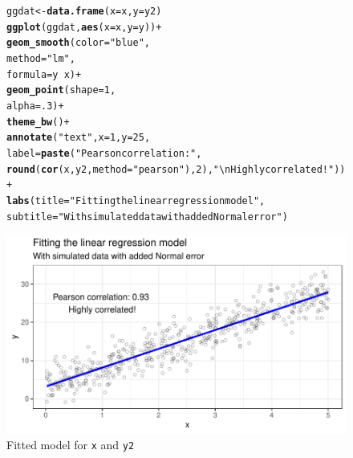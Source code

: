 \documentclass{article}\usepackage[]{graphicx}\usepackage[]{color}
\makeatletter
\def\maxwidth{ %
  \ifdim\Gin@nat@width>\linewidth
    \linewidth
  \else
    \Gin@nat@width
  \fi
}
\newcommand{\hlnum}[1]{\textcolor[rgb]{0.686,0.059,0.569}{#1}}%
\newcommand{\hlstr}[1]{\textcolor[rgb]{0.192,0.494,0.8}{#1}}%
\newcommand{\hlopt}[1]{\textcolor[rgb]{0,0,0}{#1}}%
\newcommand{\hlstd}[1]{\textcolor[rgb]{0.345,0.345,0.345}{#1}}%
\newcommand{\hlkwb}[1]{\textcolor[rgb]{0.69,0.353,0.396}{#1}}%
\newcommand{\hlkwc}[1]{\textcolor[rgb]{0.333,0.667,0.333}{#1}}%
\newcommand{\hlkwd}[1]{\textcolor[rgb]{0.737,0.353,0.396}{\textbf{#1}}}%
\newenvironment{kframe}{%
 \def\at@end@of@kframe{}%
 \ifinner\ifhmode%
  \def\at@end@of@kframe{\end{minipage}}%
  \begin{minipage}{\columnwidth}%
 \fi\fi%
 \def\FrameCommand##1{\hskip\@totalleftmargin \hskip-\fboxsep
 \colorbox{shadecolor}{##1}\hskip-\fboxsep
     \hskip-\linewidth \hskip-\@totalleftmargin \hskip\columnwidth}%
 \MakeFramed {\advance\hsize-\width
   \@totalleftmargin\z@ \linewidth\hsize
   \@setminipage}}%
 {\par\unskip\endMakeFramed%
 \at@end@of@kframe}
\newenvironment{knitrout}{}{} %
\makeatother
\begin{document}
\begin{enumerate}
\begin{enumerate}
\begin{figure}[H]
\begin{center}
\begin{knitrout}
\color{fgcolor}\begin{kframe}
\begin{alltt}
\hlstd{ggdat}\hlkwb{<-}\hlkwd{data.frame}\hlstd{(}\hlkwc{x}\hlstd{=x,} \hlkwc{y}\hlstd{=y2)}
\hlkwd{ggplot}\hlstd{(ggdat,} \hlkwd{aes}\hlstd{(}\hlkwc{x}\hlstd{=x,} \hlkwc{y}\hlstd{=y))}\hlopt{+}
  \hlkwd{geom_smooth}\hlstd{(}\hlkwc{color}\hlstd{=}\hlstr{"blue"}\hlstd{,}
              \hlkwc{method}\hlstd{=}\hlstr{"lm"}\hlstd{,}
              \hlkwc{formula}\hlstd{=y}\hlopt{~}\hlstd{x)}\hlopt{+}
  \hlkwd{geom_point}\hlstd{(}\hlkwc{shape}\hlstd{=}\hlnum{1}\hlstd{,}
             \hlkwc{alpha}\hlstd{=}\hlnum{.3}\hlstd{)}\hlopt{+}
  \hlkwd{theme_bw}\hlstd{()}\hlopt{+}
  \hlkwd{annotate}\hlstd{(}\hlstr{"text"}\hlstd{,} \hlkwc{x}\hlstd{=}\hlnum{1}\hlstd{,} \hlkwc{y}\hlstd{=}\hlnum{25}\hlstd{,}
           \hlkwc{label}\hlstd{=}\hlkwd{paste}\hlstd{(}\hlstr{"Pearson correlation:"}\hlstd{,}
                       \hlkwd{round}\hlstd{(}\hlkwd{cor}\hlstd{(x,y2,}\hlkwc{method}\hlstd{=}\hlstr{"pearson"}\hlstd{),}\hlnum{2}\hlstd{),}\hlstr{"\textbackslash{}nHighly correlated!"}\hlstd{))}\hlopt{+}
  \hlkwd{labs}\hlstd{(}\hlkwc{title}\hlstd{=}\hlstr{"Fitting the linear regression model"}\hlstd{,}
       \hlkwc{subtitle}\hlstd{=}\hlstr{"With simulated data with added Normal error"}\hlstd{)}
\end{alltt}
\end{kframe}
\includegraphics[width=\maxwidth]{figure/p3plot2-1} 
\end{knitrout}
\caption{Fitted model for \texttt{x} and \texttt{y2}}
\label{p3plot2}
\end{center}
\end{figure}


\end{enumerate}
\end{enumerate}
\end{document}
